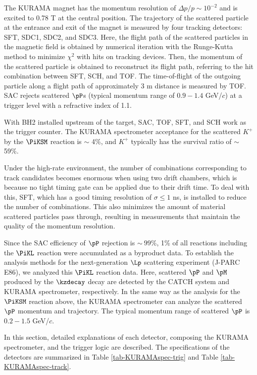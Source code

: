 The KURAMA magnet has the momentum resolution of $\Delta p/p \sim10^{-2}$ \cite{Miwa-SMp} and is excited to 0.78 T at the central position. The trajectory of the scattered particle at the entrance and exit of the magnet is measured by four tracking detectors: SFT, SDC1, SDC2, and SDC3. Here, the flight path of the scattered particles in the magnetic field is obtained by numerical iteration with the Runge-Kutta method \cite{Runge} to minimize $\chi^2$ with hits on tracking devices. Then, the momentum of the scattered particle is obtained to reconstruct its flight path, referring to the hit combination between SFT, SCH, and TOF. The time-of-flight of the outgoing particle along a flight path of approximately 3 m distance is measured by TOF. SAC rejects scattered $\pP$s (typical momentum range of $0.9-1.4$ GeV/$c$) at a trigger level with a refractive index of 1.1.%

With BH2 installed upstream of the target, SAC, TOF, SFT, and SCH work as the trigger counter. The KURAMA spectrometer acceptance for the scattered $K^+$ by the $\PiKSM$ reaction is $\sim$ 4\%, and $K^+$ typically has the survival ratio of $\sim$ 59\%. 
  
Under the high-rate environment, the number of combinations corresponding to track candidates becomes enormous when using two drift chambers, which is because no tight timing gate can be applied due to their drift
time. To deal with this, SFT, which has a good timing resolution of $\sigma \leq 1$ ns, is installed to reduce the number of combinations. This also minimizes the amount of material scattered particles pass through, resulting in measurements that maintain the quality of the momentum resolution.

Since the SAC efficiency of $\pP$ rejection is $\sim\ 99$\%, 1\% of all reactions including the $\PiKL$ reaction were accumulated as a byproduct data. To establish the analysis methods for the next-generation $\Lp$ scattering experiment (J-PARC E86), we analyzed this $\PiKL$ reaction data. Here, scattered $\pP$ and $\pM$ produced by the $\kzdecay$ decay are detected by the CATCH system and KURAMA spectrometer, respectively. In the same way as the analysis for the $\PiKSM$ reaction above, the KURAMA spectrometer can analyze the scattered $\pP$ momentum and trajectory. The typical momentum range of scattered $\pP$ is $0.2-1.5$ GeV/$c$.

In this section, detailed explanations of each detector, composing the KURAMA spectrometer, and the trigger logic are described. The specifications of the detectors are summarized in Table \ref{tab-KURAMAspec-trig} and Table \ref{tab-KURAMAspec-track}.


